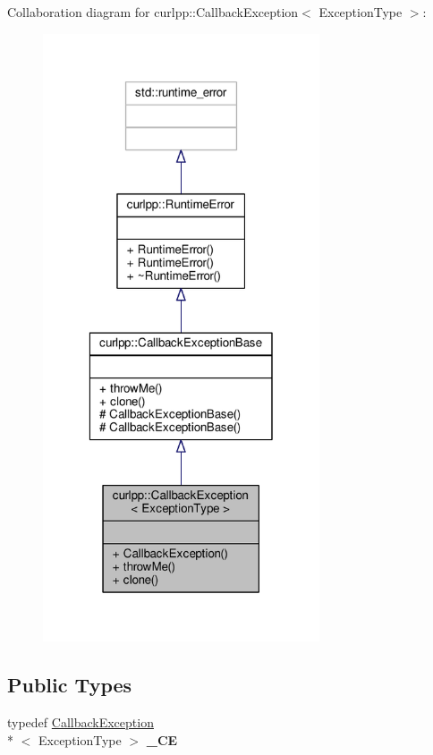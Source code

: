 Collaboration diagram for curlpp\-:\-:Callback\-Exception$<$ Exception\-Type $>$\-:\nopagebreak
\begin{figure}[H]
\begin{center}
\leavevmode
\includegraphics[width=232pt]{classcurlpp_1_1CallbackException__coll__graph}
\end{center}
\end{figure}
\subsection*{Public Types}
\begin{DoxyCompactItemize}
\item 
\hypertarget{classcurlpp_1_1CallbackException_a14c78c379d35648c686fbcebee24b678}{typedef \hyperlink{classcurlpp_1_1CallbackException}{Callback\-Exception}\\*
$<$ Exception\-Type $>$ {\bfseries \-\_\-\-C\-E}}\label{classcurlpp_1_1CallbackException_a14c78c379d35648c686fbcebee24b678}

\end{DoxyCompactItemize}
